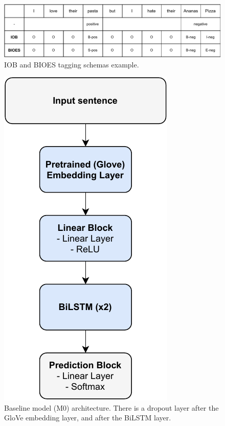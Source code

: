\documentclass[11pt,a4paper]{article}
\begin{document}
	\begin{figure}[H]
		\centering
		\includegraphics[width=1\columnwidth]{IOB_BIOES_example.pdf}
		\caption{IOB and BIOES tagging schemas example.}
		\label{fig:IOB_BIOES}
	\end{figure}
	
	\begin{figure}[H]
		\centering
		\includegraphics[width=0.7\columnwidth]{M0_diagram.pdf}
		\caption{Baseline model (M0) architecture. There is a dropout layer after the GloVe embedding layer, and after the BiLSTM layer.}
		\label{fig:M0_architecture}
	\end{figure}
	
\end{document}
